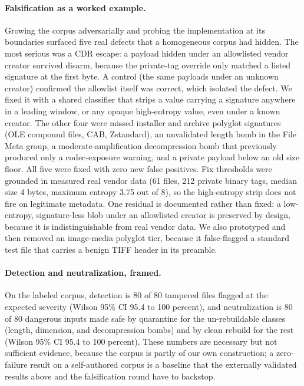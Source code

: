 \documentclass[11pt]{article}
\begin{document}
\paragraph{Falsification as a worked example.} Growing the corpus adversarially and probing the implementation at its boundaries surfaced five real defects that a homogeneous corpus had hidden. The most serious was a CDR escape: a payload hidden under an allowlisted vendor creator survived disarm, because the private-tag override only matched a listed signature at the first byte. A control (the same payloads under an unknown creator) confirmed the allowlist itself was correct, which isolated the defect. We fixed it with a shared classifier that strips a value carrying a signature anywhere in a leading window, or any opaque high-entropy value, even under a known creator. The other four were missed installer and archive polyglot signatures (OLE compound files, CAB, Zstandard), an unvalidated length bomb in the File Meta group, a moderate-amplification decompression bomb that previously produced only a codec-exposure warning, and a private payload below an old size floor. All five were fixed with zero new false positives. Fix thresholds were grounded in measured real vendor data (61 files, 212 private binary tags, median size 4 bytes, maximum entropy 3.75 out of 8), so the high-entropy strip does not fire on legitimate metadata. One residual is documented rather than fixed: a low-entropy, signature-less blob under an allowlisted creator is preserved by design, because it is indistinguishable from real vendor data. We also prototyped and then removed an image-media polyglot tier, because it false-flagged a standard test file that carries a benign TIFF header in its preamble.

\paragraph{Detection and neutralization, framed.} On the labeled corpus, detection is 80 of 80 tampered files flagged at the expected severity (Wilson 95\% CI 95.4 to 100 percent), and neutralization is 80 of 80 dangerous inputs made safe by quarantine for the un-rebuildable classes (length, dimension, and decompression bombs) and by clean rebuild for the rest (Wilson 95\% CI 95.4 to 100 percent). These numbers are necessary but not sufficient evidence, because the corpus is partly of our own construction; a zero-failure result on a self-authored corpus is a baseline that the externally validated results above and the falsification round have to backstop.
\end{document}
